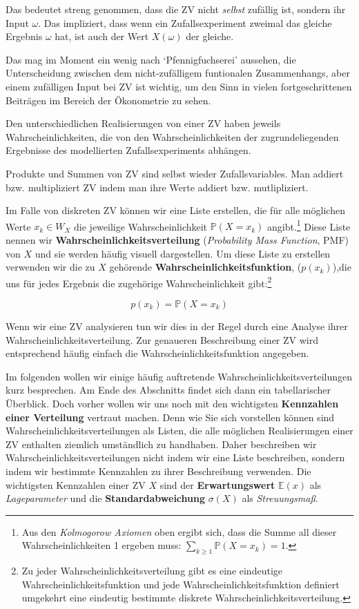 \documentclass[]{book}
\let\rmarkdownfootnote\footnote%
\def\footnote{\protect\rmarkdownfootnote}
\begin{document}
Das bedeutet streng genommen, dass die ZV nicht \emph{selbst} zufällig
ist, sondern ihr Input \(\omega\). Das impliziert, dass wenn ein
Zufallsexperiment zweimal das gleiche Ergebnis \(\omega\) hat, ist auch
der Wert \(X(\omega)\) der gleiche.

Das mag im Moment ein wenig nach `Pfennigfuchserei' aussehen, die
Unterscheidung zwischen dem nicht-zufälligem funtionalen Zusammenhangs,
aber einem zufälligen Input bei ZV ist wichtig, um den Sinn in vielen
fortgeschrittenen Beiträgen im Bereich der Ökonometrie zu sehen.

Den unterschiedlichen Realisierungen von einer ZV haben jeweils
Wahrscheinlichkeiten, die von den Wahrscheinlichkeiten der
zugrundeliegenden Ergebnisse des modellierten Zufallsexperiments
abhängen.

Produkte und Summen von ZV sind selbst wieder Zufallsvariables. Man
addiert bzw. multipliziert ZV indem man ihre Werte addiert bzw.
mutlipliziert.

Im Falle von diskreten ZV können wir eine Liste erstellen, die für alle
möglichen Werte \(x_k\in W_X\) die jeweilige Wahrscheinlichkeit
\(\mathbb{P}(X=x_k)\) angibt.\footnote{Aus den \emph{Kolmogorow Axiomen}
  oben ergibt sich, dass die Summe all dieser Wahrscheinlichkeiten 1
  ergeben muss: \(\sum_{k\geq 1}\mathbb{P}(X=x_k)=1\).} Diese Liste
nennen wir \textbf{Wahrscheinlichkeitsverteilung} (\emph{Probability
Mass Function}, PMF) von \(X\) und sie werden häufig visuell
dargestellen. Um diese Liste zu erstellen verwenden wir die zu \(X\)
gehörende \textbf{Wahrscheinlichkeitsfunktion}, (\(p(x_k)\)),die uns für
jedes Ergebnis die zugehörige Wahrscheinlichkeit gibt:\footnote{Zu jeder
  Wahrscheinlichkeitsverteilung gibt es eine eindeutige
  Wahrscheinlichkeitsfunktion und jede Wahrscheinlichkeitsfunktion
  definiert umgekehrt eine eindeutig bestimmte diskrete
  Wahrscheinlichkeitsverteilung.}

\[p(x_k)=\mathbb{P}(X=x_k)\]

Wenn wir eine ZV analysieren tun wir dies in der Regel durch eine
Analyse ihrer Wahrscheinlichkeitsverteilung. Zur genaueren Beschreibung
einer ZV wird entsprechend häufig einfach die
Wahrscheinlichkeitsfunktion angegeben.

Im folgenden wollen wir einige häufig auftretende
Wahrscheinlichkeitsverteilungen kurz besprechen. Am Ende des Abschnitts
findet sich dann ein tabellarischer Überblick. Doch vorher wollen wir
uns noch mit den wichtigsten \textbf{Kennzahlen einer Verteilung}
vertraut machen. Denn wie Sie sich vorstellen können sind
Wahrscheinlichkeitsverteilungen als Listen, die alle möglichen
Realisierungen einer ZV enthalten ziemlich umständlich zu handhaben.
Daher beschreiben wir Wahrscheinlichkeitsverteilungen nicht indem wir
eine Liste beschreiben, sondern indem wir bestimmte Kennzahlen zu ihrer
Beschreibung verwenden. Die wichtigsten Kennzahlen einer ZV \(X\) sind
der \textbf{Erwartungswert} \(\mathbb{E}(x)\) als \emph{Lageparameter}
und die \textbf{Standardabweichung} \(\sigma(X)\) als
\emph{Streuungsmaß}.
\end{document}
